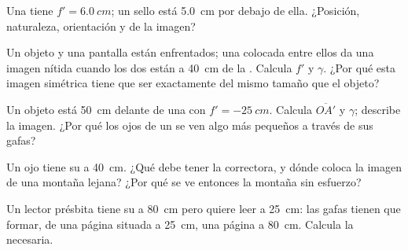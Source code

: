 \begin{exercise}[$\star\star$]\label{exo:g11:lenses-and-eye:7}
Una  tiene $f' = \qty{6.0}{cm}$; un sello está \qty{5.0}{cm} por
debajo de ella. ¿Posición, naturaleza, orientación y  de la
imagen?
\end{exercise}

\begin{exercise}[$\star\star$]\label{exo:g11:lenses-and-eye:8}
Un objeto y una pantalla están enfrentados; una 
colocada entre ellos da una imagen nítida cuando los dos están a
\qty{40}{cm} de la . Calcula $f'$ y $\gamma$. ¿Por qué esta imagen
simétrica tiene que ser exactamente del mismo tamaño que el objeto?
\end{exercise}

\begin{exercise}[$\star\star$]\label{exo:g11:lenses-and-eye:9}
Un objeto está \qty{50}{cm} delante de una  con
$f' = \qty{-25}{cm}$. Calcula $\overline{OA'}$ y $\gamma$; describe la
imagen. ¿Por qué los ojos de un  se ven algo más pequeños a través
de sus gafas?
\end{exercise}

\begin{exercise}[$\star\star$]\label{exo:g11:lenses-and-eye:10}
Un ojo  tiene su  a \qty{40}{cm}. ¿Qué 
debe tener la  correctora, y dónde coloca la imagen de una montaña
lejana? ¿Por qué se ve entonces la montaña sin esfuerzo?
\end{exercise}

\begin{exercise}[$\star\star$]\label{exo:g11:lenses-and-eye:11}
Un lector présbita tiene su  a \qty{80}{cm} pero quiere
leer a \qty{25}{cm}: las gafas tienen que formar, de una página situada
a \qty{25}{cm}, una página  a \qty{80}{cm}. Calcula la  necesaria.
\end{exercise}

